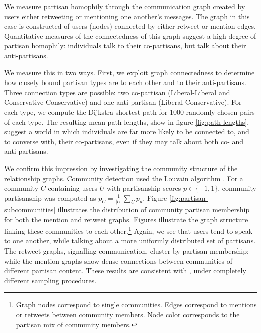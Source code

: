 \documentclass{article}
\begin{document}
We measure partisan homophily through the communication graph created
by users either retweeting or mentioning one another's messages. The
graph in this case is constructed of users (nodes) connected by either
retweet or mention edges. Quantitative measures of the connectedness
of this graph suggest a high degree of partisan homophily: individuals
talk to their co-partisans, but talk about their anti-partisans.

We measure this in two ways. First, we exploit graph connectedness to
determine how closely bound partisan types are to each other and to
their anti-partisans. Three connection types are possible: two
co-partisan (Liberal-Liberal and Conservative-Conservative) and one
anti-partisan (Liberal-Conservative). For each type, we compute the
Dijkstra shortest path for 1000 randomly chosen pairs of each
type. The resulting mean path lengths, show in figure
\ref{fig:path-lengths}, suggest a world in which individuals are far
more likely to be connected to, and to converse with, their
co-partisans, even if they may talk about both co- and anti-partisans.

We confirm this impression by investigating the community structure of
the relationship graphs. Community detection used the Louvain
algorithm \cite{blondel2008fast}. For a community $C$ containing
users $U$ with partisanship scores $p \in \{-1, 1\}$, community partisanship was computed
as $p_C = \frac{1}{\left|U\right|}\sum_U p_u$. Figure
\ref{fig:partisan-subcommunities} 
illustrates the distribution of community partisan membership
for both the mention and retweet graphs. Figures
 illustrate the graph
structure linking these communities to each other.\footnote{Graph
  nodes correspond to single communities. Edges correspond to mentions
or retweets between community members. Node color corresponds to the
partisan mix of community members.} Again, we see that users tend
to speak to one another, while talking about a more uniformly
distributed set of partisans. The retweet graphs, signalling
communication, cluster by partisan membership; while the mention
graphs show dense connections between communities of different
partisan content. These results are consistent with
\cite{conover2011}, under completely different sampling procedures. 



\end{document}
